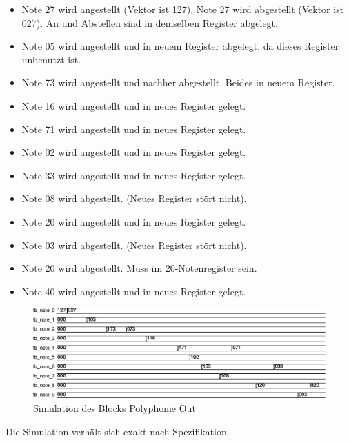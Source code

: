 \begin{itemize}
\item Note 27 wird angestellt (Vektor ist 127), Note 27 wird abgestellt (Vektor ist 027). An und Abstellen sind in demselben Register abgelegt.
\item Note 05 wird angestellt und in neuem Register abgelegt, da dieses Register unbenutzt ist.
\item Note 73 wird angestellt und nachher abgestellt. Beides in neuem Register.
\item Note 16 wird angestellt und in neues Register gelegt.
\item Note 71 wird angestellt und in neues Register gelegt.
\item Note 02 wird angestellt und in neues Register gelegt.
\item Note 33 wird angestellt und in neues Register gelegt.
\item Note 08 wird abgestellt. (Neues Register stört nicht).
\item Note 20 wird angestellt und in neues Register gelegt.
\item Note 03 wird abgestellt. (Neues Register stört nicht).
\item Note 20 wird abgestellt. Muss im 20-Notenregister sein.
\item Note 40 wird angestellt und in neues Register gelegt.
\end{itemize}

\begin{figure}[H]
	\includegraphics[width=1\textwidth]{images/midi_interface/tb_polyphonie.png}
	\caption{Simulation des Blocks Polyphonie Out }
	\label{fig.polyphnie_simulation}
\end{figure}

Die Simulation verhält sich exakt nach Spezifikation.
